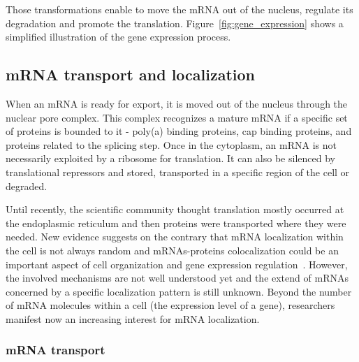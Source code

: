 \noindent
Those transformations enable to move the \ac{mRNA} out of the nucleus, regulate its degradation and promote the translation.
Figure~\ref{fig:gene_expression} shows a simplified illustration of the gene expression process.


\subsection{mRNA transport and localization}
\label{subsec:intro_rna_transport}

When an \ac{mRNA} is ready for export, it is moved out of the nucleus through the nuclear pore complex.
This complex recognizes a mature \ac{mRNA} if a specific set of proteins is bounded to it - poly(a) binding proteins, cap binding proteins, and proteins related to the splicing step.
Once in the cytoplasm, an \ac{mRNA} is not necessarily exploited by a ribosome for translation.
It can also be silenced by translational repressors and stored, transported in a specific region of the cell or degraded.

Until recently, the scientific community thought translation mostly occurred at the endoplasmic reticulum and then proteins were transported where they were needed.
New evidence suggests on the contrary that \ac{mRNA} localization within the cell is not always random and \ac{mRNA}s-proteins colocalization could be an important aspect of cell organization and gene expression regulation~\cite{lecuyer_global_2007}.
However, the involved mechanisms are not well understood yet and the extend of \ac{mRNA}s concerned by a specific localization pattern is still unknown.
Beyond the number of \ac{mRNA} molecules within a cell (the expression level of a gene), researchers manifest now an increasing interest for \ac{mRNA} localization.

\subsubsection{mRNA transport}

